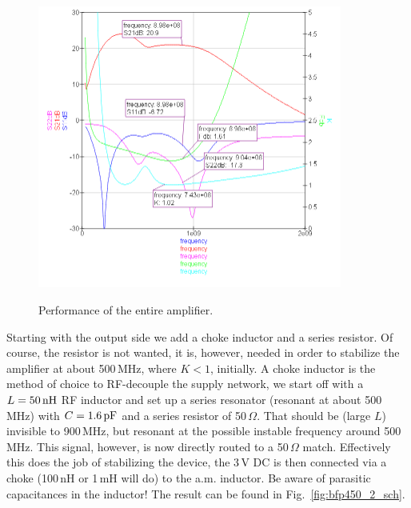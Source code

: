\begin{figure}
  \centering
  {\includegraphics[width=10cm]{bfp450_2_result.png}}
  \caption{Performance of the entire amplifier.}
  \label{fig:bfp450_2_result}
\end{figure}

Starting with the output side we add a choke inductor and a series
resistor. Of course, the resistor is not wanted, it is, however,
needed in order to stabilize the amplifier at about 500\,MHz, where
$K<1$, initially. A choke inductor is the method of choice to
RF-decouple the supply network, we start off with a $L=50\,\mathrm{nH}$
RF inductor and set up a series resonator (resonant at about 500\,MHz)
with $C=1.6\,\mathrm{pF}$ and a series resistor of 50\,$\Omega$. That
should be (large $L$) invisible to 900\,MHz, but resonant at the
possible instable frequency around 500\,MHz. This signal, however, is
now directly routed to a 50\,$\Omega$ match. Effectively this does the
job of stabilizing the device, the 3\,V DC is then connected via a
choke (100\,nH or 1\,mH will do) to the a.m. inductor. Be aware of
parasitic capacitances in the inductor! The result can be found in
Fig.~\ref{fig:bfp450_2_sch}.

